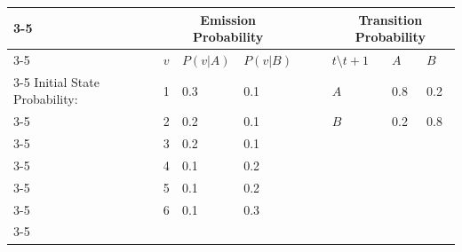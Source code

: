 \documentclass[10pt]{article}
\begin{document}
\begin{center}
\begin{tabular}{ll|lll|llll}
\cline{3-5} \cline{7-9}
\multicolumn{1}{c}{} & \multicolumn{1}{l|}{~\hspace{1.5cm}~} & \multicolumn{3}{c|}{Emission Probability} & \multicolumn{1}{l|}{~\hspace{1.5cm}~} & \multicolumn{3}{c|}{Transition Probability} \\ \cline{3-5} \cline{7-9} 
 &  & \multicolumn{1}{l|}{$v$} & \multicolumn{1}{l|}{$P(v | A)$} & $P(v | B)$ & \multicolumn{1}{l|}{} & \multicolumn{1}{l|}{$t \setminus t + 1$} & \multicolumn{1}{l|}{$A$} & \multicolumn{1}{l|}{$B$} \\ \cline{3-5} \cline{7-9} 
Initial State Probability: &  & \multicolumn{1}{l|}{1} & \multicolumn{1}{l|}{0.3} & 0.1 & \multicolumn{1}{l|}{} & \multicolumn{1}{l|}{$A$} & \multicolumn{1}{l|}{0.8} & \multicolumn{1}{l|}{0.2} \\ \cline{3-5} \cline{7-9} 
\multirow{2}{*}{$\begin{cases} \Pi_A = 0.7 \\ \Pi_b = 0.3 \end{cases}$} &  & \multicolumn{1}{l|}{2} & \multicolumn{1}{l|}{0.2} & 0.1 & \multicolumn{1}{l|}{} & \multicolumn{1}{l|}{$B$} & \multicolumn{1}{l|}{0.2} & \multicolumn{1}{l|}{0.8} \\ \cline{3-5} \cline{7-9} 
 &  & \multicolumn{1}{l|}{3} & \multicolumn{1}{l|}{0.2} & 0.1 &  &  &  &  \\ \cline{3-5}
 &  & \multicolumn{1}{l|}{4} & \multicolumn{1}{l|}{0.1} & 0.2 &  &  &  &  \\ \cline{3-5}
 &  & \multicolumn{1}{l|}{5} & \multicolumn{1}{l|}{0.1} & 0.2 &  &  &  &  \\ \cline{3-5}
 &  & \multicolumn{1}{l|}{6} & \multicolumn{1}{l|}{0.1} & 0.3 &  &  &  &  \\ \cline{3-5}
\end{tabular}\\
\vspace{2em}
\end{center}
\end{document}

